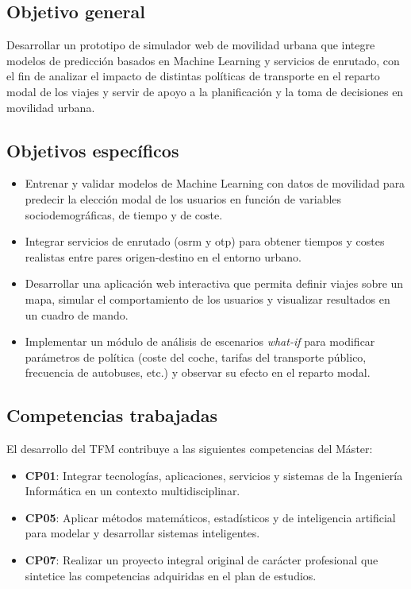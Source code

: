 \subsection{Objetivo general}

Desarrollar un prototipo de simulador web de movilidad urbana que integre modelos de predicción basados en Machine Learning y servicios de enrutado, con el fin de analizar el impacto de distintas políticas de transporte en el reparto modal de los viajes y servir de apoyo a la planificación y la toma de decisiones en movilidad urbana.

\subsection{Objetivos específicos}

\begin{itemize}
    \item Entrenar y validar modelos de Machine Learning con datos de movilidad para predecir la elección modal de los usuarios en función de variables sociodemográficas, de tiempo y de coste.
    \item Integrar servicios de enrutado (\acrshort{osrm} y \acrshort{otp}) para obtener tiempos y costes realistas entre pares origen-destino en el entorno urbano.
    \item Desarrollar una aplicación web interactiva que permita definir viajes sobre un mapa, simular el comportamiento de los usuarios y visualizar resultados en un cuadro de mando.
    \item Implementar un módulo de análisis de escenarios \textit{what-if} para modificar parámetros de política (coste del coche, tarifas del transporte público, frecuencia de autobuses, etc.) y observar su efecto en el reparto modal.
\end{itemize}

\subsection{Competencias trabajadas}

El desarrollo del TFM contribuye a las siguientes competencias del Máster:

\begin{itemize}
    \item \textbf{CP01}: Integrar tecnologías, aplicaciones, servicios y sistemas de la Ingeniería Informática en un contexto multidisciplinar.
    \item \textbf{CP05}: Aplicar métodos matemáticos, estadísticos y de inteligencia artificial para modelar y desarrollar sistemas inteligentes.
    \item \textbf{CP07}: Realizar un proyecto integral original de carácter profesional que sintetice las competencias adquiridas en el plan de estudios.
\end{itemize}

